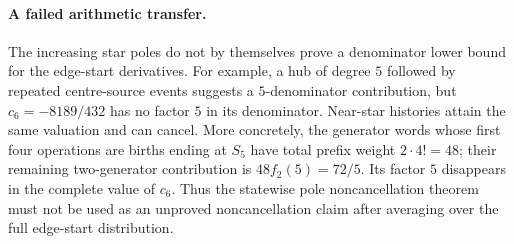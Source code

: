 \paragraph{A failed arithmetic transfer.}
The increasing star poles do not by themselves prove a denominator
lower bound for the edge-start derivatives. For example, a hub of
degree $5$ followed by repeated centre-source events suggests a
$5$-denominator contribution, but
$c_6=-8189/432$ has no factor $5$ in its denominator. Near-star histories
attain the same valuation and can cancel. More concretely, the
generator words whose first four operations are births ending at
$S_5$ have total prefix weight $2\cdot4!=48$; their remaining
two-generator contribution is $48f_2(5)=72/5$. Its factor $5$
disappears in the complete value of $c_6$. Thus the statewise pole
noncancellation theorem must not be used as an unproved noncancellation
claim after averaging over the full edge-start distribution.
